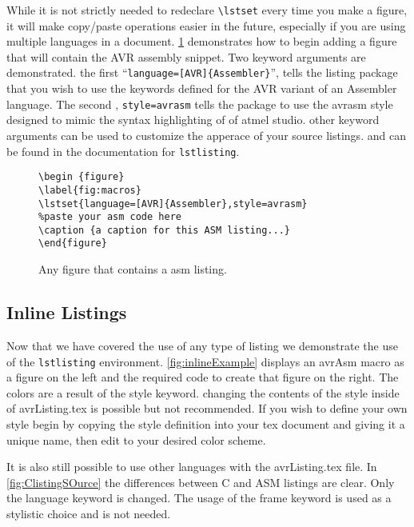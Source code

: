 \documentclass[titlepage]{article}
\begin{document}
 While it is not strictly needed to redeclare \verb|\lstset| every time you make a figure, it will make copy/paste operations easier in the future, especially if you are using multiple languages in a document. \cref{fig:figurePreamble} demonstrates how to begin adding a figure that will contain the AVR assembly snippet. Two keyword arguments are demonstrated. the first ``\verb|language=[AVR]{Assembler}|'', tells the listing package that you wish to use the keywords defined for the AVR variant of an Assembler language. The second , \verb|style=avrasm| tells the package to use the avrasm style designed to mimic the syntax highlighting of of atmel studio. other keyword arguments can be used to customize the apperace of your source listings. and can be found in the documentation for \texttt{lstlisting}.
 
\begin{figure}[h!]
\label{fig:figurePreamble}
\lstset{language=Tex,style=ListingSample,frame=single}
\begin{lstlisting}
\begin {figure}
\label{fig:macros}
\lstset{language=[AVR]{Assembler},style=avrasm}
%paste your asm code here
\caption {a caption for this ASM listing...}
\end{figure}

\end{lstlisting}
\caption{Any figure that contains a asm listing.}
\end{figure}

\subsection{Inline Listings}
Now that we have covered the use of any type of listing we demonstrate the use of the \texttt{lstlisting} environment. \cref{fig:inlineExample} displays an avrAsm macro as a figure on the left and the required code to create that figure on the right. The colors are a result of the style keyword. changing the contents of the style inside of avrListing.tex is possible but not recommended. If you wish to define your own style begin by copying the style definition into your tex document and giving it a unique name, then edit to your desired color scheme.

It is also still possible to use other languages with the avrListing.tex file. In \cref{fig:ClistingSOurce} the differences between C and ASM listings are clear. Only the language keyword is changed. The usage of the frame keyword is used as a stylistic choice and is not needed.
\end{document}
